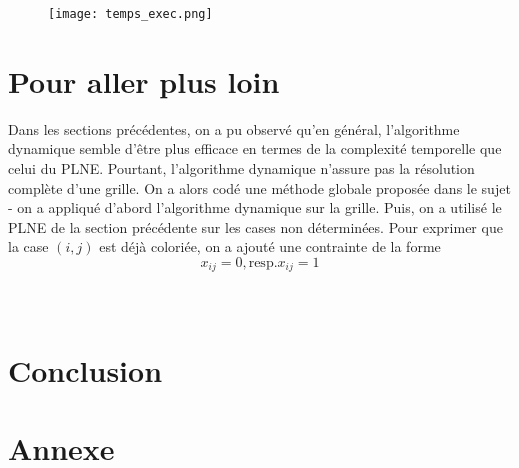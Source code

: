 \documentclass[10pt,a4paper]{article}
\begin{document}
\begin{figure}[H]
\texttt{[image: temps\_exec.png]}
\end{figure} 


\section{Pour aller plus loin}
\noindent
Dans les sections précédentes, on a pu observé qu'en général, l'algorithme dynamique semble d'être plus efficace en termes de la complexité temporelle que celui du PLNE. Pourtant, l'algorithme dynamique n'assure pas la résolution complète d'une grille. On a alors codé une méthode globale proposée dans le sujet - on a appliqué d'abord l'algorithme dynamique sur la grille. Puis, on a utilisé le PLNE de la section précédente sur les cases non déterminées. Pour exprimer que la case $(i,j)$ est déjà coloriée, on a ajouté une contrainte de la forme 
$$x_{ij} = 0, \mathrm{resp.} x_{ij} = 1$$ \\ \\

\section*{Conclusion}
\section*{Annexe}
\end{document}
